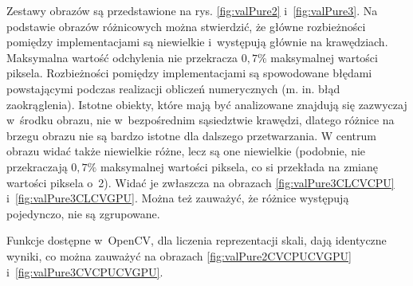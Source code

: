 Zestawy obrazów są przedstawione na rys. \ref{fig:valPure2} i~\ref{fig:valPure3}. Na podstawie obrazów różnicowych można stwierdzić, że główne rozbieżności pomiędzy implementacjami są niewielkie i~występują głównie na krawędziach. Maksymalna wartość odchylenia nie przekracza $ 0,7\% $ maksymalnej wartości piksela. Rozbieżności pomiędzy implementacjami są spowodowane błędami powstającymi podczas realizacji obliczeń numerycznych (m. in. błąd zaokrąglenia). Istotne obiekty, które mają być analizowane znajdują się zazwyczaj w~środku obrazu, nie w~bezpośrednim sąsiedztwie krawędzi, dlatego różnice na brzegu obrazu nie są bardzo istotne dla dalszego przetwarzania. W centrum obrazu widać także niewielkie różne, lecz są one niewielkie (podobnie, nie przekraczają $ 0,7\% $ maksymalnej wartości piksela, co si przekłada na zmianę wartości piksela o~2). Widać je zwłaszcza na obrazach \ref{fig:valPure3CLCVCPU} i~\ref{fig:valPure3CLCVGPU}. Można też zauważyć, że różnice występują pojedynczo, nie są zgrupowane.

Funkcje dostępne w~OpenCV, dla liczenia reprezentacji skali, dają identyczne wyniki, co można zauważyć na obrazach \ref{fig:valPure2CVCPUCVGPU} i~\ref{fig:valPure3CVCPUCVGPU}.

